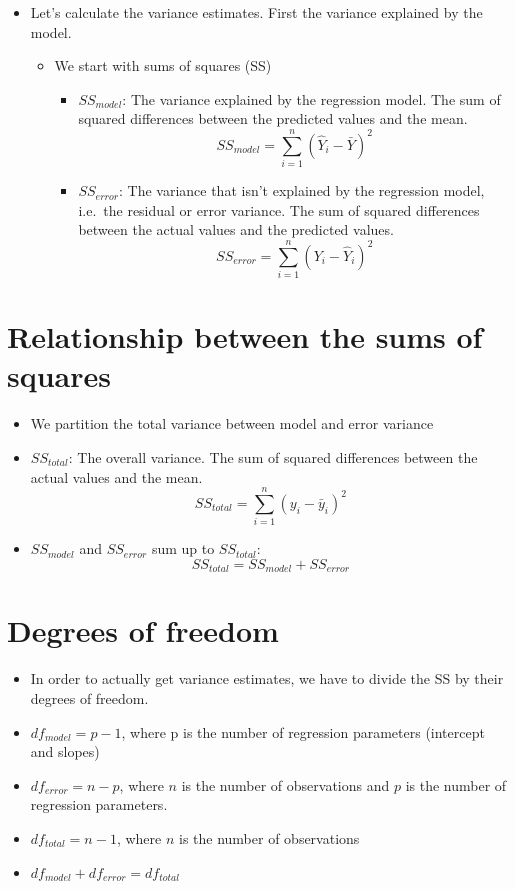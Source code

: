 \documentclass[]{article}
\providecommand{\tightlist}{%
  \setlength{\itemsep}{0pt}\setlength{\parskip}{0pt}}
\begin{document}
\begin{itemize}
\tightlist
\item
  Let's calculate the variance estimates. First the variance explained
  by the model.

  \begin{itemize}
  \tightlist
  \item
    We start with sums of squares (SS)

    \begin{itemize}
    \tightlist
    \item
      \(SS_{model}\): The variance explained by the regression model.
      The sum of squared differences between the predicted values and
      the mean.
      \[SS_{model} = \sum\limits_{i=1}^{n}(\hat{Y}_i - \bar{Y})^2\]
    \item
      \(SS_{error}\): The variance that isn't explained by the
      regression model, i.e.~the residual or error variance. The sum of
      squared differences between the actual values and the predicted
      values. \[SS_{error} = \sum\limits_{i=1}^{n}(Y_i - \hat{Y}_i)^2\]
    \end{itemize}
  \end{itemize}
\end{itemize}

\section{Relationship between the sums of
squares}\label{relationship-between-the-sums-of-squares}

\begin{itemize}
\tightlist
\item
  We partition the total variance between model and error variance\\
\item
  \(SS_{total}\): The overall variance. The sum of squared differences
  between the actual values and the mean.
  \[SS_{total} = \sum\limits_{i=1}^{n}(y_i - \bar{y}_i)^2\]
\item
  \(SS_{model}\) and \(SS_{error}\) sum up to \(SS_{total}\):
  \[SS_{total} = SS_{model} + SS_{error}\]
\end{itemize}

\section{Degrees of freedom}\label{degrees-of-freedom}

\begin{itemize}
\tightlist
\item
  In order to actually get variance estimates, we have to divide the SS
  by their degrees of freedom.
\item
  \(df_{model} = p - 1\), where p is the number of regression parameters
  (intercept and slopes)
\item
  \(df_{error} = n - p\), where \(n\) is the number of observations and
  \(p\) is the number of regression parameters.
\item
  \(df_{total} = n - 1\), where \(n\) is the number of observations
\item
  \(df_{model} + df_{error} = df_{total}\)
\end{itemize}
\end{document}

